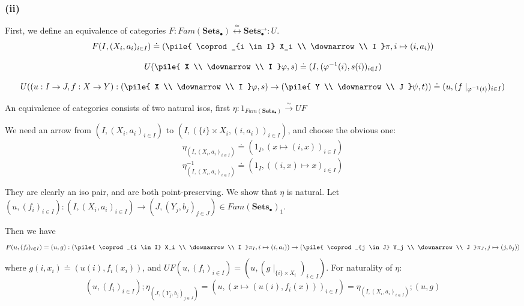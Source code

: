 \documentclass{article}
\newcommand{\mbf}{\mathbf}
\newcommand{\vrt}[2]{
\pile{
#1 \\
\downarrow \\
#2
}
}
\begin{document}
\subsubsection*{(ii)}

First, we define an equivalence of categories 
$F : Fam(\mbf{Sets_{\bullet}}) \overset{\simeq}{\longleftrightarrow} \mbf{Sets_{\bullet}^{\to}} : U$.
$$F(I, (X_i,a_i)_{i \in I}) \doteq (\vrt{\coprod_{i \in I} X_i}{I}\pi, i \mapsto (i, a_i))$$



$$U(\vrt{X}{I}\varphi,s) \doteq (I, (\varphi^{-1}(i), s(i))_{i \in I})$$

$$U( (u : I \to J, f : X \to Y) : (\vrt{X}{I} \varphi, s) \to (\vrt{Y}{J}\psi,t) ) \doteq (u, (f \mid_{\varphi^{-1}(i)})_{i \in I})$$

An equivalence of categories consists of two natural isos, first $\eta : 1_{Fam(\mbf{Sets_{\bullet}})} \overset{\sim}{\longrightarrow} UF$

We need an arrow from $(I, (X_i, a_i)_{i \in I})$ to $(I, (\{i\} \times X_i, (i,a_i))_{i \in I})$, and choose the obvious one:
$$\eta_{(I, (X_i, a_i)_{i \in I})} \doteq (1_I, (x \mapsto (i,x))_{i \in I})$$
$$\eta^{-1}_{(I, (X_i, a_i)_{i \in I})} \doteq (1_I, ((i,x) \mapsto x)_{i \in I})$$

They are clearly an iso pair, and are both point-preserving. We show that $\eta$ is natural.
Let $(u,(f_i)_{i \in I}) : (I, (X_i,a_i)_{i \in I}) \to (J, (Y_j, b_j)_{j \in J}) \in Fam(\mbf{Sets_\bullet})_1$. 

Then we have 
$$F(u,(f_i)_{i \in I}) = (u, g)  : (\vrt{\coprod_{i \in I} X_i}{I}\pi_I, i \mapsto (i, a_i)) \to 
  (\vrt{\coprod_{j \in J} Y_j}{J}\pi_J, j \mapsto (j, b_j))$$ %
where $g(i,x_i) \doteq (u(i),f_i(x_i))$,
and
$UF(u,(f_i)_{i \in I}) = (u, (g \mid_{\{i\} \times X_i})_{i \in I})$. %
For naturality of $\eta$:
$$(u,(f_i)_{i \in I});\eta_{(J, (Y_j, b_j)_{j \in J})} = (u, (x \mapsto (u(i), f_i(x)))_{i \in I}) = 
  \eta_{(I, (X_i,a_i)_{i \in I})};(u,g)$$ 
\end{document}
